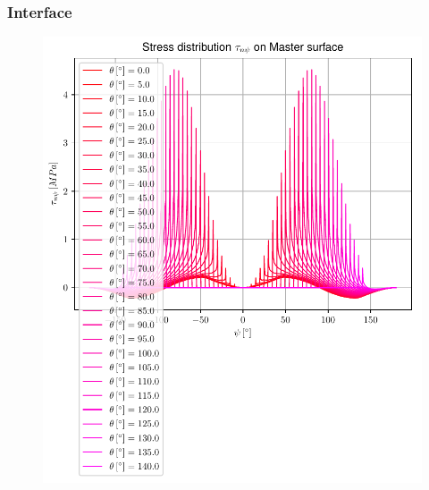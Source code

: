 \documentclass[first,firstsupp,lastsupp,handout,last,hyperref,table]{ETHclass}
\begin{document}
\begin{frame}
\frametitle{\vspace{0.35cm}\scriptsize Interface}
\vspace{-0.85cm}
\begin{figure}
\includegraphics[height=0.9\textheight]{2017-03-03_AbqRunSummary_AllInPlaneShearOnMaster.pdf}
\end{figure}
\end{frame}
\end{document}
